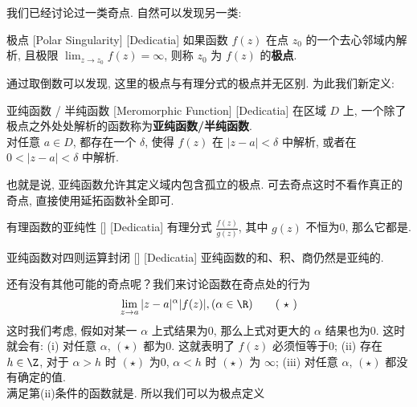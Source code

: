 \documentclass[UTF8]{ctexart}
\begin{document}
        我们已经讨论过一类奇点. 自然可以发现另一类: 

        \begin{dfn}
            [PolarSingularity]
            {极点}
            [Polar Singularity]
            [Dedicatia]
            如果函数 \(f(z)\) 在点 \(z_0\) 的一个去心邻域内解析, 且极限 \(\lim_{z \to z_0} f(z) = \infty\), 则称 \(z_0\) 为 \(f(z)\) 的\textbf{极点}. 
        \end{dfn}

        通过取倒数可以发现, 这里的极点与有理分式的极点并无区别. 为此我们新定义: 

        \begin{dfn}
            [MeromorphicFunction]
            {亚纯函数 / 半纯函数}
            [Meromorphic Function]
            [Dedicatia]
            在区域 \(D\) 上, 一个除了极点之外处处解析的函数称为\textbf{亚纯函数/半纯函数}.\\
            对任意 \(a\in D\), 都存在一个 \(\delta\), 使得 \(f(z)\) 在 \(|z-a|<\delta\) 中解析, 或者在 \(0<|z-a|<\delta\) 中解析. 
        \end{dfn}

        也就是说, 亚纯函数允许其定义域内包含孤立的极点. 可去奇点这时不看作真正的奇点, 直接使用延拓函数补全即可. 

        \begin{crl}
            [UUID]
            {有理函数的亚纯性}
            []
            [Dedicatia]
            有理分式 \(\frac{f(z)}{g(z)}\), 其中 \(g(z)\) 不恒为0, 那么它都是\MeromorphicFunction.
        \end{crl}

        \begin{ppt}
            [UUID]
            {亚纯函数对四则运算封闭}
            []
            [Dedicatia]
            亚纯函数的和、积、商仍然是亚纯的. 
        \end{ppt}

        还有没有其他可能的奇点呢？我们来讨论函数在奇点处的行为
        \[\lim_{z\to a}|z-a|^\alpha |f(z)|, (\alpha\in\R)\tag{ \(\star\) }\]
        这时我们考虑, 假如对某一 \(\alpha\) 上式结果为0, 那么上式对更大的 \(\alpha\) 结果也为0. 这时就会有: (i) 对任意 \(\alpha\),  \((\star)\) 都为0. 这就表明了 \(f(z)\) 必须恒等于0; (ii) 存在 \(h\in\Z\), 对于 \(\alpha>h\) 时 \((\star)\) 为0,  \(\alpha<h\) 时 \((\star)\) 为 \(\infty\); (iii) 对任意 \(\alpha\),  \((\star)\) 都没有确定的值. \\
        满足第(ii)条件的函数就是\MeromorphicFunction. 所以我们可以为极点定义
\end{document}
